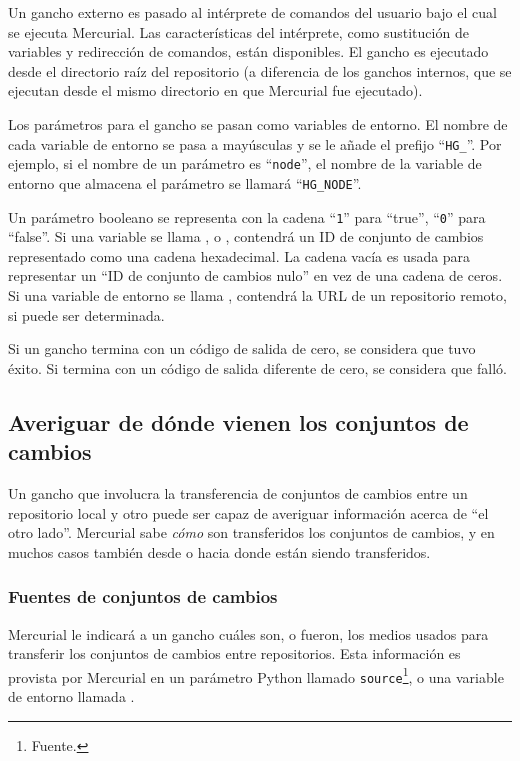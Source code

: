 Un gancho externo es pasado al intérprete de comandos del usuario bajo
el cual se ejecuta Mercurial. Las características del intérprete, como
sustitución de variables y redirección de comandos, están disponibles.
El gancho es ejecutado desde el directorio raíz del repositorio
(a diferencia de los ganchos internos, que se ejecutan desde el mismo
directorio en que Mercurial fue ejecutado).

Los parámetros para el gancho se pasan como variables de entorno. El
nombre de cada variable de entorno se pasa a mayúsculas y se le añade
el prefijo ``\texttt{HG\_}''.  Por ejemplo, si el nombre de un
parámetro es ``\texttt{node}'', el nombre de la variable de entorno
que almacena el parámetro se llamará ``\texttt{HG\_NODE}''.

Un parámetro booleano se representa con la cadena ``\texttt{1}'' para
``true'', ``\texttt{0}'' para ``false''.  Si una variable se llama
,  o ,  
contendrá un ID de conjunto de cambios representado como una cadena
hexadecimal. La cadena vacía es usada para representar un ``ID de
conjunto de cambios nulo'' en vez de una cadena de ceros. Si una
variable de entorno se llama , contendrá la URL de un
repositorio remoto, si puede ser determinada.

Si un gancho termina con un código de salida de cero, se considera que
tuvo éxito. Si termina con un código de salida diferente de cero, se
considera que falló.

\subsection{Averiguar de dónde vienen los conjuntos de cambios}

Un gancho que involucra la transferencia de conjuntos de cambios entre
un repositorio local y otro puede ser capaz de averiguar información
acerca de ``el otro lado''. Mercurial sabe \emph{cómo} son
transferidos los conjuntos de cambios, y en muchos casos también desde
o hacia donde están siendo transferidos.

\subsubsection{Fuentes de conjuntos de cambios}
\label{sec:hook:sources}

Mercurial le indicará a un gancho cuáles son, o fueron, los medios
usados para transferir los conjuntos de cambios entre repositorios.
Esta información es provista por Mercurial en un parámetro Python
llamado \texttt{source}\footnote{Fuente.}, o una variable de entorno
llamada .

